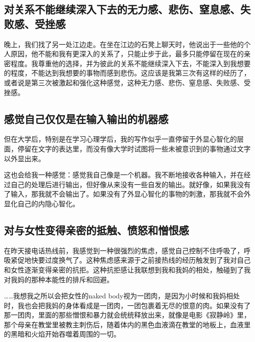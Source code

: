 





\subsection*{对关系不能继续深入下去的无力感、悲伤、窒息感、失败感、受挫感}

晚上，我们找了另一处江边走。在坐在江边的石凳上聊天时，他说出于一些他的个人原因，他不能和我有更深入的关系了，只能止步于此，最多只能停留在现在的亲密程度。我尊重他的选择，并为彼此的关系不能继续深入下去，不能深入到我想要的程度，不能达到我想要的事物而感到悲伤。这应该是我第三次有这样的经历了，或者说是第三次被激起和强化这种感觉，这种无力感、悲伤、窒息感、失败感、受挫感。







\subsection*{感觉自己仅仅是在输入输出的机器感}

但在大学后，特别是在学习心理学后，我的写作似乎一直停留于外显心智化的层面，停留在文字的表达里，而没有像大学时试图将一些未被意识到的事物通过文字以外显出来。

这也会给我一种感觉：感觉我自己像是一个机器。我不断地接收各种输入，并在经过自己的处理后进行输出，但好像从来没有一些自发的输出。就好像，如果我没有了输入，那我就不会输出了。如果没有了外显心智化的事物的刺激，那我就不会外显化自己的内隐心智化。







\subsection*{对与女性变得亲密的抵触、愤怒和憎恨感}

在昨天接电话热线前，我感觉到一种很强烈的焦虑，感觉自己控制不住呼吸了，呼吸紧促地快要过度换气了。这种焦虑感来源于之前接热线的经历触发到了我对自己和女性逐渐变得亲密的抗拒。这种抗拒感让我联想到我和我妈的相处，触碰到了我对我妈的那种本能性的排斥和回避。

……我想我之所以会把女性的naked body视为一团肉，是因为小时候和我妈相处时，我也会把我妈的身体看成是一团肉，一团包裹着无尽的恨意的肉。如果没有了那一团肉，里面的那些憎恨和暴力就会统统释放出来，就像是电影《寂静岭》里，那个母亲在教堂里被教主刺伤后，随着体内的黑色血液滴在教堂的地板上，血液里的黑暗和火焰开始吞噬着周围的一切。

